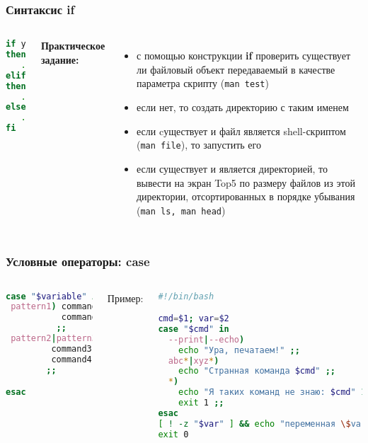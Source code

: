 
\begin{frame}[fragile]
\frametitle{Синтаксис {\bf if}}

	\begin{columns}
	
	\begin{lstlisting}[language=bash]
if условие1
then
   . . .
elif условие2
then
   . . .
else
   . . .
fi
\end{lstlisting}
	\pause
	{\bf Практическое задание:} \\
	\begin{itemize}

		\item с помощью конструкции {\bf if} проверить существует ли файловый объект передаваемый в качестве параметра скрипту ({\tt man test})
		\item если нет, то создать директорию с таким именем
		\item если cуществует и файл является shell-скриптом ({\tt man file}), то запустить его
		\item если существует и является директорией, то вывести на экран Top5 по размеру файлов из этой директории, 
		    отсортированных в порядке убывания ({\tt man ls, man head})
	\end{itemize}
	\end{columns}
\end{frame}

\begin{frame}[fragile]
\frametitle{Условные операторы: case}

	\small
	\begin{columns}
		\column{0.3\textwidth}

		\begin{lstlisting}[language=sh,frame=single]
case "$variable" in 
 pattern1) command1
           command2
          ;;
 pattern2|pattern3)
         command3
         command4
        ;;

esac
		\end{lstlisting}
		\pause

		\column{0.7\textwidth}
		{\normalsize Пример:}

		\begin{lstlisting}[language=sh]
#!/bin/bash

cmd=$1; var=$2
case "$cmd" in 
  --print|--echo)
    echo "Ура, печатаем!" ;;
  abc*|xyz*)
    echo "Странная команда $cmd" ;;
  *)
    echo "Я таких команд не знаю: $cmd" 1>&2
    exit 1 ;;
esac
[ ! -z "$var" ] && echo "переменная \$var=$var"
exit 0
		\end{lstlisting}


	\end{columns}
\end{frame}

